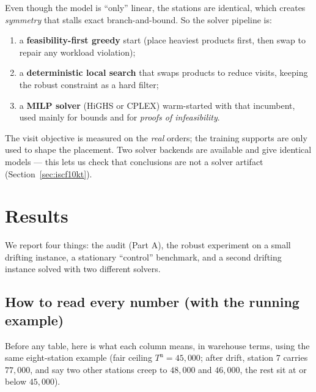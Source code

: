 \documentclass[11pt]{article}
\theoremstyle{definition}
\theoremstyle{plain}
\theoremstyle{remark}
\begin{document}
Even though the model is ``only'' linear, the stations are identical, which
creates \emph{symmetry} that stalls exact branch-and-bound. So the solver
pipeline is:
\begin{enumerate}[label=(\arabic*),nosep]
  \item a \textbf{feasibility-first greedy} start (place heaviest products first,
  then swap to repair any workload violation);
  \item a \textbf{deterministic local search} that swaps products to reduce
  visits, keeping the robust constraint as a hard filter;
  \item a \textbf{MILP solver} (HiGHS or CPLEX) warm-started with that
  incumbent, used mainly for bounds and for \emph{proofs of infeasibility}.
\end{enumerate}
The visit objective is measured on the \emph{real} orders; the training supports
are only used to shape the placement. Two solver backends are available and give
identical models --- this lets us check that conclusions are not a solver
artifact (Section~\ref{sec:iscf10kt}).

\section{Results}

We report four things: the audit (Part A), the robust experiment on a small
drifting instance, a stationary ``control'' benchmark, and a second drifting
instance solved with two different solvers.

\subsection{How to read every number (with the running example)}
\label{sec:metrics}

Before any table, here is what each column means, in warehouse terms, using the
same eight-station example (fair ceiling $T^{\mathrm n}=45{,}000$; after drift,
station 7 carries $77{,}000$, and say two other stations creep to $48{,}000$ and
$46{,}000$, the rest sit at or below $45{,}000$).
\end{document}
